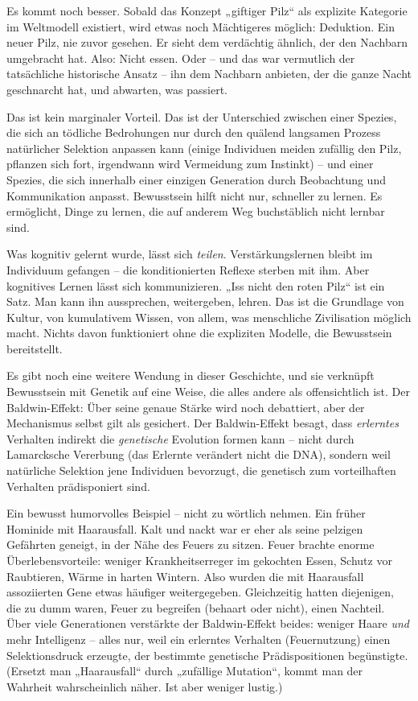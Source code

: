 \documentclass[11pt, twoside, openright]{book}
\begin{document}
Es kommt noch besser. Sobald das Konzept „giftiger Pilz“ als explizite Kategorie im Weltmodell existiert, wird etwas noch Mächtigeres möglich: Deduktion. Ein neuer Pilz, nie zuvor gesehen. Er sieht dem verdächtig ähnlich, der den Nachbarn umgebracht hat. Also: Nicht essen. Oder -- und das war vermutlich der tatsächliche historische Ansatz -- ihn dem Nachbarn anbieten, der die ganze Nacht geschnarcht hat, und abwarten, was passiert.

Das ist kein marginaler Vorteil. Das ist der Unterschied zwischen einer Spezies, die sich an tödliche Bedrohungen nur durch den quälend langsamen Prozess natürlicher Selektion anpassen kann (einige Individuen meiden zufällig den Pilz, pflanzen sich fort, irgendwann wird Vermeidung zum Instinkt) -- und einer Spezies, die sich innerhalb einer einzigen Generation durch Beobachtung und Kommunikation anpasst. Bewusstsein hilft nicht nur, schneller zu lernen. Es ermöglicht, Dinge zu lernen, die auf anderem Weg buchstäblich nicht lernbar sind.

Was kognitiv gelernt wurde, lässt sich \textit{teilen}. Verstärkungslernen bleibt im Individuum gefangen -- die konditionierten Reflexe sterben mit ihm. Aber kognitives Lernen lässt sich kommunizieren. „Iss nicht den roten Pilz“ ist ein Satz. Man kann ihn aussprechen, weitergeben, lehren. Das ist die Grundlage von Kultur, von kumulativem Wissen, von allem, was menschliche Zivilisation möglich macht. Nichts davon funktioniert ohne die expliziten Modelle, die Bewusstsein bereitstellt.

Es gibt noch eine weitere Wendung in dieser Geschichte, und sie verknüpft Bewusstsein mit Genetik auf eine Weise, die alles andere als offensichtlich ist. Der Baldwin-Effekt: Über seine genaue Stärke wird noch debattiert, aber der Mechanismus selbst gilt als gesichert. Der Baldwin-Effekt besagt, dass \textit{erlerntes} Verhalten indirekt die \textit{genetische} Evolution formen kann -- nicht durch Lamarcksche Vererbung (das Erlernte verändert nicht die DNA), sondern weil natürliche Selektion jene Individuen bevorzugt, die genetisch zum vorteilhaften Verhalten prädisponiert sind.

Ein bewusst humorvolles Beispiel -- nicht zu wörtlich nehmen. Ein früher Hominide mit Haarausfall. Kalt und nackt war er eher als seine pelzigen Gefährten geneigt, in der Nähe des Feuers zu sitzen. Feuer brachte enorme Überlebensvorteile: weniger Krankheitserreger im gekochten Essen, Schutz vor Raubtieren, Wärme in harten Wintern. Also wurden die mit Haarausfall assoziierten Gene etwas häufiger weitergegeben. Gleichzeitig hatten diejenigen, die zu dumm waren, Feuer zu begreifen (behaart oder nicht), einen Nachteil. Über viele Generationen verstärkte der Baldwin-Effekt beides: weniger Haare \textit{und} mehr Intelligenz -- alles nur, weil ein erlerntes Verhalten (Feuernutzung) einen Selektionsdruck erzeugte, der bestimmte genetische Prädispositionen begünstigte. (Ersetzt man „Haarausfall“ durch „zufällige Mutation“, kommt man der Wahrheit wahrscheinlich näher. Ist aber weniger lustig.)
\end{document}

